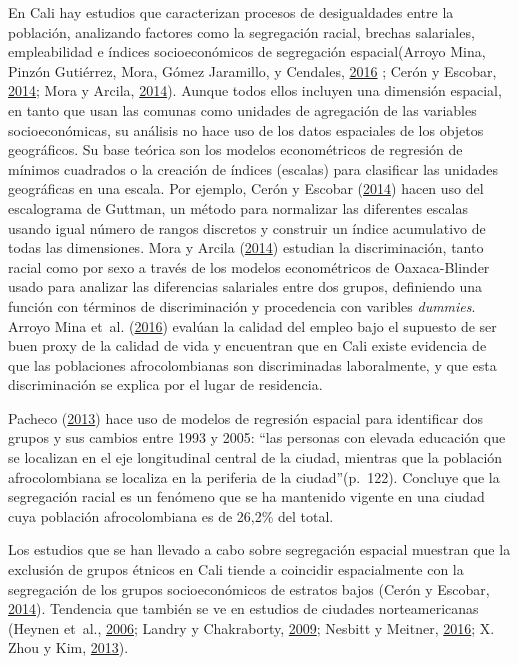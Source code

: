\documentclass[12pt,a4paper,openany]{book}
\theoremstyle{definition}
\theoremstyle{definition}
\theoremstyle{definition}
\theoremstyle{remark}
\begin{document}
En Cali hay estudios que caracterizan procesos de desigualdades entre la
población, analizando factores como la segregación racial, brechas
salariales, empleabilidad e índices socioeconómicos de segregación
espacial(Arroyo Mina, Pinzón Gutiérrez, Mora, Gómez Jaramillo, y
Cendales, \protect\hyperlink{ref-arroyo_mina_afrocolombianos_2016}{2016}
; Cerón y Escobar, \protect\hyperlink{ref-ceron_indice_2014}{2014}; Mora
y Arcila, \protect\hyperlink{ref-mora_brechas_2014}{2014}). Aunque todos
ellos incluyen una dimensión espacial, en tanto que usan las comunas
como unidades de agregación de las variables socioeconómicas, su
análisis no hace uso de los datos espaciales de los objetos geográficos.
Su base teórica son los modelos econométricos de regresión de mínimos
cuadrados o la creación de índices (escalas) para clasificar las
unidades geográficas en una escala. Por ejemplo, Cerón y Escobar
(\protect\hyperlink{ref-ceron_indice_2014}{2014}) hacen uso del
escalograma de Guttman, un método para normalizar las diferentes escalas
usando igual número de rangos discretos y construir un índice
acumulativo de todas las dimensiones. Mora y Arcila
(\protect\hyperlink{ref-mora_brechas_2014}{2014}) estudian la
discriminación, tanto racial como por sexo a través de los modelos
econométricos de Oaxaca-Blinder usado para analizar las diferencias
salariales entre dos grupos, definiendo una función con términos de
discriminación y procedencia con varibles \emph{dummies}. Arroyo Mina
et~al. (\protect\hyperlink{ref-arroyo_mina_afrocolombianos_2016}{2016})
evalúan la calidad del empleo bajo el supuesto de ser buen proxy de la
calidad de vida y encuentran que en Cali existe evidencia de que las
poblaciones afrocolombianas son discriminadas laboralmente, y que esta
discriminación se explica por el lugar de residencia.

Pacheco (\protect\hyperlink{ref-PACHECO2013121}{2013}) hace uso de
modelos de regresión espacial para identificar dos grupos y sus cambios
entre 1993 y 2005: ``las personas con elevada educación que se localizan
en el eje longitudinal central de la ciudad, mientras que la población
afrocolombiana se localiza en la periferia de la ciudad''(p.~122).
Concluye que la segregación racial es un fenómeno que se ha mantenido
vigente en una ciudad cuya población afrocolombiana es de 26,2\% del
total.

Los estudios que se han llevado a cabo sobre segregación espacial
muestran que la exclusión de grupos étnicos en Cali tiende a coincidir
espacialmente con la segregación de los grupos socioeconómicos de
estratos bajos (Cerón y Escobar,
\protect\hyperlink{ref-ceron_indice_2014}{2014}). Tendencia que también
se ve en estudios de ciudades norteamericanas (Heynen et~al.,
\protect\hyperlink{ref-heynen_political_2006}{2006}; Landry y
Chakraborty, \protect\hyperlink{ref-landry_street_2009}{2009}; Nesbitt y
Meitner, \protect\hyperlink{ref-nesbitt_exploring_2016}{2016}; X. Zhou y
Kim, \protect\hyperlink{ref-zhou_social_2013}{2013}).
\end{document}
